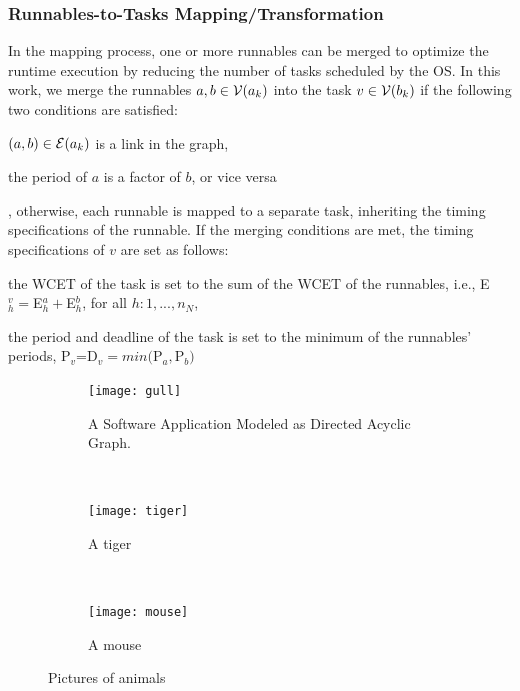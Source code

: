 \subsubsection{Runnables-to-Tasks Mapping/Transformation}\label{subsec_runnables-to-tasks}
In the mapping process, one or more runnables can be merged to optimize the runtime execution by reducing the number of tasks scheduled by the OS. In this work, we merge the runnables $a,b\in \mathcal{V}(a_{k})$ into the task $v\in \mathcal{V}(b_{k})$ if the following two conditions are satisfied:
\begin{enumerate*}[label=(\roman*)]
	\item $(a,b)\in \mathcal{E}(a_{k})$ is a link in the graph,
	\item the period of $a$ is a factor of $b$, or vice versa
\end{enumerate*}, otherwise, each runnable is mapped to a separate task, inheriting the timing specifications of the runnable.
If the merging conditions are met, the timing specifications of $v$ are set as follows: 
\begin{enumerate*}[label=(\roman*)]
	\item the WCET of the task is set to the sum of the WCET of the runnables, i.e., E$_h^v=$E$_h^a + $E$_h^b$, for all $h:1,...,n_N$,
	\item the period and deadline of the task is set to the minimum of the runnables' periods, P$_v$=D$_v=min($P$_a, $P$_b)$
\end{enumerate*}
\begin{figure}
    \centering
    \begin{subfigure}[b]{0.3\textwidth}
        \texttt{[image: gull]}
        \caption{A Software Application Modeled as Directed Acyclic Graph.}
        \label{fig:gull}
    \end{subfigure}
    ~ %
    \begin{subfigure}[b]{0.3\textwidth}
        \texttt{[image: tiger]}
        \caption{A tiger}
        \label{fig:tiger}
    \end{subfigure}
    ~ %
    \begin{subfigure}[b]{0.3\textwidth}
        \texttt{[image: mouse]}
        \caption{A mouse}
        \label{fig:mouse}
    \end{subfigure}
    \caption{Pictures of animals}\label{fig:animals}
\end{figure}

